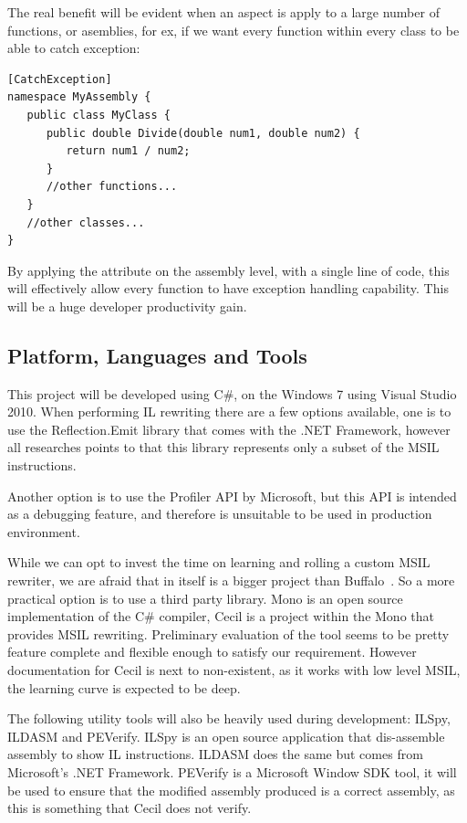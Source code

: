 The real benefit will be evident when an aspect is apply to a large number of functions, or asemblies, for ex, if we want every function within every class to be able to catch exception:

\begin{lstlisting}[caption={applying Buffalo aspect on an assembly}, label=applybuffaloassembly]
[CatchException]
namespace MyAssembly {
   public class MyClass {
      public double Divide(double num1, double num2) {
         return num1 / num2;
      }
      //other functions...
   }
   //other classes...
}
\end{lstlisting}

By applying the attribute on the assembly level, with a single line of code, this will effectively allow every function to have exception handling capability. This will be a huge developer productivity gain.

\subsection{Platform, Languages and Tools}
This project will be developed using C\#, on the Windows 7 using Visual Studio 2010. When performing IL rewriting there are a few options available, one is to use the Reflection.Emit library that comes with the .NET Framework, however all researches points to that this library represents only a subset of the MSIL instructions.

Another option is to use the Profiler API by Microsoft, but this API is intended as a debugging feature, and therefore is unsuitable to be used in production environment.

While we can opt to invest the time on learning and rolling a custom MSIL rewriter, we are afraid that in itself is a bigger project than Buffalo~\cite{msil_text}. So a more practical option is to use a third party library. Mono is an open source implementation of the C\# compiler, Cecil is a project within the Mono that provides MSIL rewriting. Preliminary evaluation of the tool seems to be pretty feature complete and flexible enough to satisfy our requirement. However documentation for Cecil is next to non-existent, as it works with low level MSIL, the learning curve is expected to be deep.

The following utility tools will also be heavily used during development: ILSpy, ILDASM and PEVerify. ILSpy is an open source application that dis-assemble assembly to show IL instructions. ILDASM does the same but comes from Microsoft’s .NET Framework. PEVerify is a Microsoft Window SDK tool, it will be used to ensure that the modified assembly produced is a correct assembly, as this is something that Cecil does not verify.


